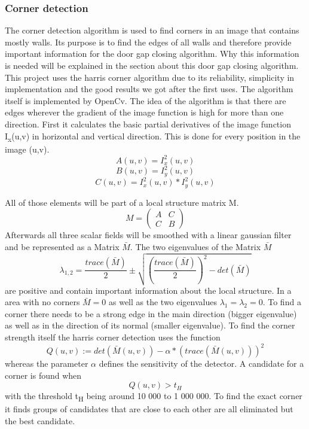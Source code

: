 \subsubsection{Corner detection}
The corner detection algorithm is used to find corners in an image that contains mostly walls. Its purpose is to find the edges of all walls and therefore provide important information for the door gap closing algorithm. Why this information is needed will be explained in the section about this door gap closing algorithm.
This project uses the harris corner algorithm due to its reliability, simplicity in implementation and the good results we got after the first uses. The algorithm itself is implemented by OpenCv.
The idea of the algorithm is that there are edges wherever the gradient of the image function is high for more than one direction.
First it calculates the basic partial derivatives of the image function I\textsubscript{x}(u,v) in horizontal and vertical direction. This is done for every position in the image (u,v).
\[A(u,v) = I_{x}^2(u,v)\]
\[B(u,v) = I_{y}^2(u,v)\]
\[C(u,v) = I_{x}^2(u,v) * I_{y}^2(u,v)\]

All of those elements will be part of a local structure matrix M.
\[M = \begin{pmatrix} A & C \\ C & B \end{pmatrix}\]
Afterwards all three scalar fields will be smoothed with a linear gaussian filter and be represented as a Matrix \begin{math}\bar{M}\end{math}.
The two eigenvalues of the Matrix \begin{math}\bar{M}\end{math}
\[\lambda_{1,2} = \dfrac{trace(\bar{M})}{2} \pm \sqrt{(\dfrac{trace(\bar{M})}{2})^2 - det(\bar{M})} \]
are positive and contain important information about the local structure. In a area with no corners \begin{math}\bar{M} = 0\end{math}  as well as the two eigenvalues \begin{math}\lambda_1 = \lambda_2 = 0\end{math}. To find a corner there needs to be a strong edge in the main direction (bigger eigenvalue) as well as in the direction of its normal (smaller eigenvalue). 
To find the corner strength itself the harris corner detection uses the function 
\[Q(u,v) := det(\bar{M}(u,v)) - \alpha * (trace(\bar{M}(u,v)))^2\]
whereas the parameter \begin{math}\alpha\end{math} defines the sensitivity of the detector. A candidate for a corner is found when
\[Q(u,v) > t_H\]
with the threshold t\textsubscript{H} being around 10 000 to 1 000 000. To find the exact corner it finds groups of candidates that are close to each other are all eliminated but the best candidate.

